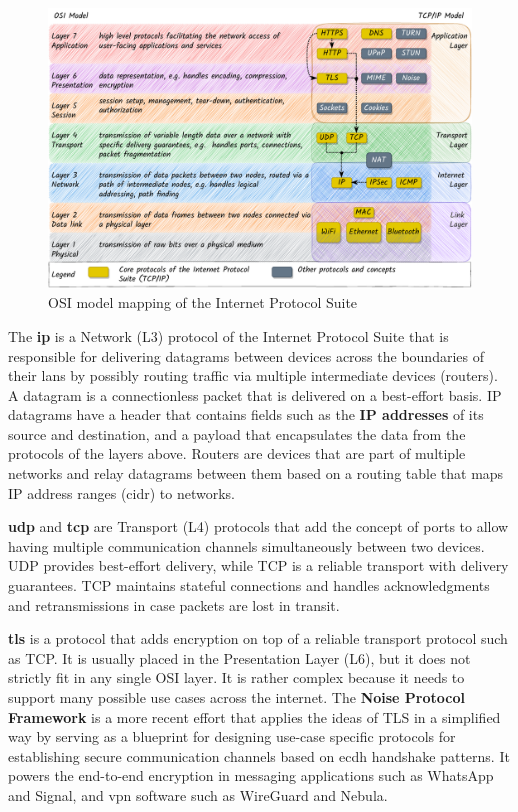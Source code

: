 \begin{figure}
\centering
\includegraphics[width=1\textwidth,height=\textheight]{thesis/../figures/osi-map-tcp.drawio.pdf}
\caption{OSI model mapping of the Internet Protocol
Suite\label{osi-map-tcp}}
\end{figure}

The \textbf{\acrfull{ip}} is a Network (L3) protocol of the Internet
Protocol Suite that is responsible for delivering datagrams between
devices across the boundaries of their \glspl{lan} by possibly routing
traffic via multiple intermediate devices (routers). A datagram is a
connectionless packet that is delivered on a best-effort basis. IP
datagrams have a header that contains fields such as the \textbf{IP
addresses} of its source and destination, and a
payload that encapsulates the data from the protocols of the layers
above. Routers are devices that are part of multiple networks and relay
datagrams between them based on a routing table that maps IP address
ranges (\gls{cidr}) to networks.

\textbf{\acrfull{udp}} and \textbf{\acrfull{tcp}} are Transport (L4)
protocols that add the concept of ports to allow having multiple
communication channels simultaneously between two devices. UDP provides
best-effort delivery, while TCP is a reliable transport with delivery
guarantees. TCP maintains stateful connections and handles
acknowledgments and retransmissions in case packets are lost in transit.

\textbf{\acrfull{tls}} is a protocol that adds encryption on top of a
reliable transport protocol such as TCP. It is usually placed in the
Presentation Layer (L6), but it does not strictly fit in any single OSI
layer. It is rather complex because it needs to support many possible
use cases across the internet.  The \textbf{Noise Protocol
Framework} \autocite{noiseDocs} is a more
 recent effort that applies the
ideas of TLS in a simplified way by serving as a blueprint for designing
use-case specific protocols for establishing secure communication
channels based on \gls{ecdh} handshake patterns. It powers the
end-to-end encryption in messaging applications such as WhatsApp and
Signal, and \gls{vpn} software such as WireGuard and Nebula.

